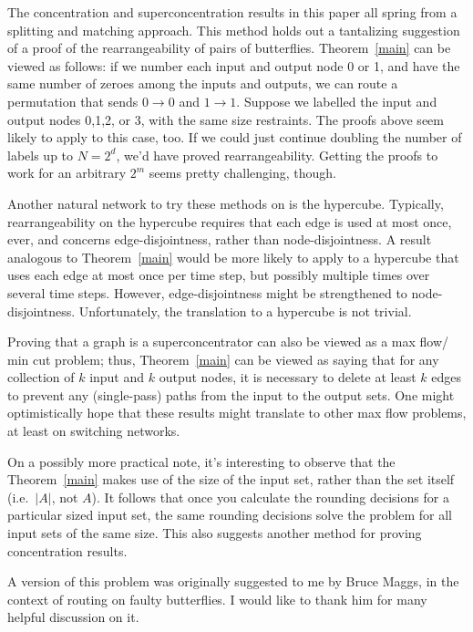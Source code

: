 \documentclass[12pt]{article}
\begin{document}
The concentration and superconcentration 
results in this paper all spring from a splitting
and matching approach.
This method holds out a tantalizing suggestion of a
proof of the rearrangeability of pairs of butterflies.
Theorem~\ref{main} can be viewed as follows: if we number each
input and output node 0 or 1, and have the same number of 
zeroes among the inputs and outputs, we can route a permutation
that sends $0\rightarrow 0$ and $1\rightarrow 1$.  
Suppose we labelled the input and output nodes
0,1,2, or 3, with the same size restraints.  The proofs above seem
likely to apply to this case, too.  If we could just continue
doubling the number of labels up to $N=2^{d}$, we'd have proved
rearrangeability.  Getting the proofs to work for an arbitrary
$2^{m}$ seems pretty challenging, though.

Another natural network to try these methods on is the hypercube.
Typically, rearrangeability on the hypercube requires that each
edge is used at most once, ever, and concerns edge-disjointness, rather
than node-disjointness.  A result analogous to 
Theorem~\ref{main} would be more likely to apply to a hypercube
that uses each edge at most once per time step, but possibly multiple
times over several time steps.  However, edge-disjointness might
be strengthened to node-disjointness.  Unfortunately, the translation
to a hypercube is not trivial.

Proving that a graph is a superconcentrator can also be viewed as a
max flow/ min cut problem; thus, Theorem~\ref{main} can be viewed as 
saying that
for any collection of $k$ input and $k$ output nodes, it is 
necessary to delete at least $k$ edges to prevent any (single-pass)
paths from the input to the output sets.  One might optimistically hope
that these results might translate to other max flow problems, at least
on switching networks.

On a possibly more practical note, it's interesting to observe that the
Theorem~\ref{main} makes use of the size of the 
input set, rather than the set itself (i.e.\ $|A|$, not $A$).  It follows that
once you calculate the rounding decisions for a particular sized
input set, the same rounding decisions solve the problem for all
input sets of the same size.  This also suggests another method for
proving concentration results.

A version of this problem was originally suggested to me by Bruce Maggs, 
in the 
context of routing on faulty butterflies.  I would like to thank him for
many helpful discussion on it.



\end{document}
